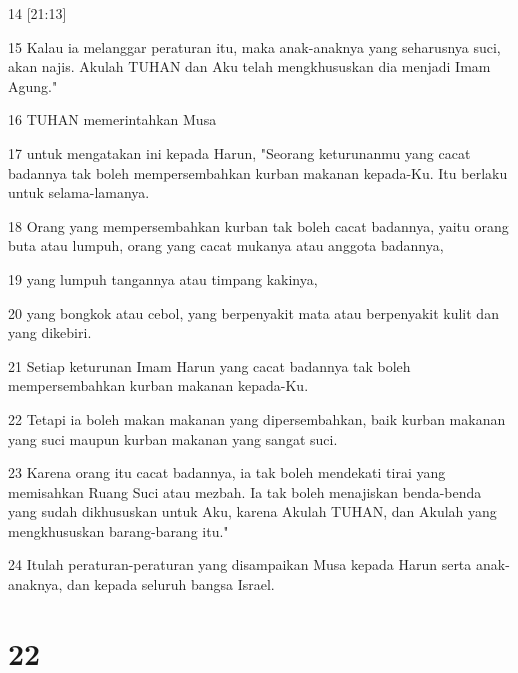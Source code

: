 \par 14 [21:13]
\par 15 Kalau ia melanggar peraturan itu, maka anak-anaknya yang seharusnya suci, akan najis. Akulah TUHAN dan Aku telah mengkhususkan dia menjadi Imam Agung."
\par 16 TUHAN memerintahkan Musa
\par 17 untuk mengatakan ini kepada Harun, "Seorang keturunanmu yang cacat badannya tak boleh mempersembahkan kurban makanan kepada-Ku. Itu berlaku untuk selama-lamanya.
\par 18 Orang yang mempersembahkan kurban tak boleh cacat badannya, yaitu orang buta atau lumpuh, orang yang cacat mukanya atau anggota badannya,
\par 19 yang lumpuh tangannya atau timpang kakinya,
\par 20 yang bongkok atau cebol, yang berpenyakit mata atau berpenyakit kulit dan yang dikebiri.
\par 21 Setiap keturunan Imam Harun yang cacat badannya tak boleh mempersembahkan kurban makanan kepada-Ku.
\par 22 Tetapi ia boleh makan makanan yang dipersembahkan, baik kurban makanan yang suci maupun kurban makanan yang sangat suci.
\par 23 Karena orang itu cacat badannya, ia tak boleh mendekati tirai yang memisahkan Ruang Suci atau mezbah. Ia tak boleh menajiskan benda-benda yang sudah dikhususkan untuk Aku, karena Akulah TUHAN, dan Akulah yang mengkhususkan barang-barang itu."
\par 24 Itulah peraturan-peraturan yang disampaikan Musa kepada Harun serta anak-anaknya, dan kepada seluruh bangsa Israel.

\chapter{22}

